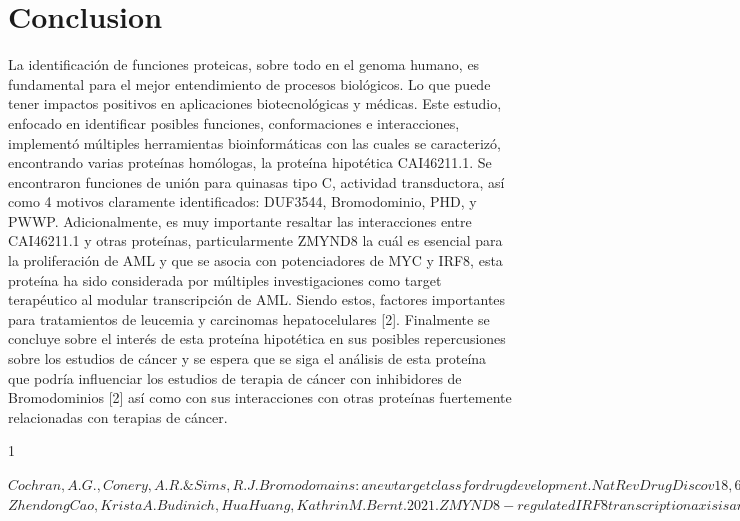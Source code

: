 \documentclass[journal,transmag]{IEEEtran}
\begin{document}
   \section{Conclusion}
 
   La identificación de funciones proteicas, sobre todo en el genoma humano, es fundamental para el mejor entendimiento de procesos biológicos. Lo que puede tener impactos positivos en aplicaciones biotecnológicas y médicas. Este estudio, enfocado en identificar posibles funciones, conformaciones e interacciones, implementó múltiples herramientas bioinformáticas con las cuales se caracterizó, encontrando varias proteínas homólogas, la proteína hipotética CAI46211.1. Se encontraron funciones de unión para quinasas tipo C, actividad transductora, así como 4 motivos claramente identificados: DUF3544, Bromodominio, PHD, y PWWP.
Adicionalmente, es muy importante resaltar las interacciones entre CAI46211.1 y otras proteínas, particularmente ZMYND8 la cuál es esencial para la proliferación de AML y que se asocia con   potenciadores de MYC y IRF8, esta proteína  ha sido  considerada por múltiples investigaciones como target terapéutico  al modular transcripción  de AML. Siendo estos, factores importantes para tratamientos de leucemia y carcinomas hepatocelulares [2]. 
Finalmente se concluye sobre el interés de esta proteína hipotética en sus posibles repercusiones sobre los estudios de cáncer y se espera que se siga el análisis de esta proteína que podría influenciar los estudios de terapia de cáncer con inhibidores de Bromodominios [2] así como con sus interacciones con otras proteínas fuertemente relacionadas con terapias de cáncer.  


\ifCLASSOPTIONcaptionsoff
  \newpage
\fi


\begin{thebibliography}{1}


 $Cochran, A.G., Conery, A.R. \& Sims, R.J. Bromodomains: a new target class for drug development. Nat Rev Drug Discov 18, 609-628 (2019). https://doi.org/10.1038/s41573-019-0030-7
$
 $Zhendong Cao, Krista A. Budinich, Hua Huang, Kathrin M. Bernt . 2021. ZMYND8-regulated IRF8 transcription axis is an acute myeloid leukemia dependency.  ARTICLE MOLECULAR CELL VOLUME 81, ISSUE 17, P3604-3622.E10, SEPTEMBER 02, 2021- :https://doi.org/10.1016/j.molcel.2021.07.018
$
\end{thebibliography}
\end{document}
